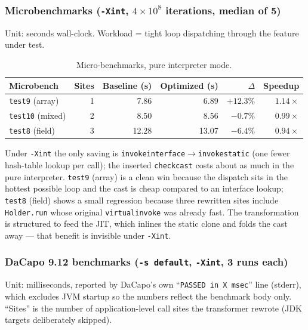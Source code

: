 \documentclass[11pt,a4paper]{article}
\begin{document}
\subsubsection*{Microbenchmarks (\texttt{-Xint}, $4\times 10^8$ iterations, median of 5)}

Unit: seconds wall-clock. Workload = tight loop dispatching through the
feature under test.

\begin{table}[h]
\centering
\small
\begin{tabular}{@{}lrrrrr@{}}
\toprule
Microbench              & Sites & Baseline (s) & Optimized (s) & $\Delta$ & Speedup \\
\midrule
\texttt{test9} (array)  & 1  & 7.86  & 6.89  & $+12.3\%$ & $1.14\times$ \\
\texttt{test10} (mixed) & 2  & 8.50  & 8.56  & $-0.7\%$  & $0.99\times$ \\
\texttt{test8} (field)  & 3  & 12.28 & 13.07 & $-6.4\%$  & $0.94\times$ \\
\bottomrule
\end{tabular}
\caption{Micro-benchmarks, pure interpreter mode.}
\end{table}

Under \texttt{-Xint} the only saving is
\texttt{invokeinterface}$\to$\texttt{invokestatic} (one fewer hash-table
lookup per call); the inserted \texttt{checkcast} costs about as much in
the pure interpreter. \texttt{test9} (array) is a clean win because the
dispatch sits in the hottest possible loop and the cast is cheap compared
to an interface lookup; \texttt{test8} (field) shows a small regression
because three rewritten sites include \texttt{Holder.run} whose original
\texttt{virtualinvoke} was already fast. The transformation is structured
to feed the JIT, which inlines the static clone and folds the cast away
--- that benefit is invisible under \texttt{-Xint}.

\subsubsection*{DaCapo 9.12 benchmarks (\texttt{-s default}, \texttt{-Xint}, 3 runs each)}

Unit: milliseconds, reported by DaCapo's own ``\texttt{PASSED in X msec}''
line (stderr), which excludes JVM startup so the numbers reflect the
benchmark body only. ``Sites'' is the number of application-level call
sites the transformer rewrote (JDK targets deliberately skipped).
\end{document}

